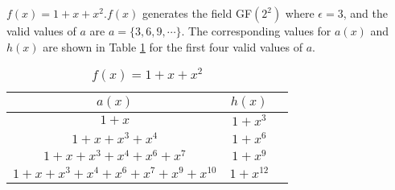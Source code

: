 \begin{example}
$f(x)=1+x+x^2$.\newline $f(x)$ generates the field GF$(2^2)$ where $\epsilon=3$, and the  valid values of $a$ are $a=\{3,6,9,\cdots \}$. The corresponding values for $a(x)$ and $h(x)$ are shown in Table \ref{novelTab2} for the first four valid values of $a$.
\begin{table}[htbp]
 \caption{$f(x)=1+x+x^2$}
\centering
 \begin{tabular}{c c c} 
 $a(x)$ & $h(x)$ \\ [0.5ex] 
 \hline\hline
$1+x$
 & $1+x^{3}$ \\
\hline
$1+x+x^3+x^4$
 & $1+x^{6}$ 
 \\
\hline
$1+x+x^3+x^4+x^6+x^{7}$ 
&  $1+x^{9}$ 
\\
\hline
$1+x+x^3+x^4+x^6+x^{7}+x^9+x^{10}$
 &  $1+x^{12}$ \\
 \end{tabular}
 \label{novelTab2}
\end{table}
\end{example}

